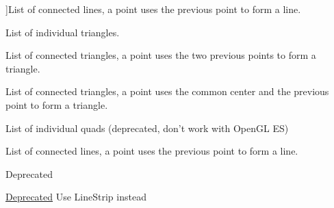 \begin{Desc}
\begin{description}
{}]List of connected lines, a point uses the previous point to form a line. \item[{\em 
\hypertarget{group__graphics_gga5ee56ac1339984909610713096283b1babdd5e75b8944a886fdaa30e5bb3adc0d}{Triangles}\label{group__graphics_gga5ee56ac1339984909610713096283b1babdd5e75b8944a886fdaa30e5bb3adc0d}
}]List of individual triangles. \item[{\em 
\hypertarget{group__graphics_gga5ee56ac1339984909610713096283b1ba05e55fec6d32c2fc8328f94d07f91184}{Triangle\-Strip}\label{group__graphics_gga5ee56ac1339984909610713096283b1ba05e55fec6d32c2fc8328f94d07f91184}
}]List of connected triangles, a point uses the two previous points to form a triangle. \item[{\em 
\hypertarget{group__graphics_gga5ee56ac1339984909610713096283b1ba363f7762b33706c805c6a451ad554f5e}{Triangle\-Fan}\label{group__graphics_gga5ee56ac1339984909610713096283b1ba363f7762b33706c805c6a451ad554f5e}
}]List of connected triangles, a point uses the common center and the previous point to form a triangle. \item[{\em 
\hypertarget{group__graphics_gga5ee56ac1339984909610713096283b1bac968add05250b2cf59350dc68043a3c0}{Quads}\label{group__graphics_gga5ee56ac1339984909610713096283b1bac968add05250b2cf59350dc68043a3c0}
}]List of individual quads (deprecated, don't work with Open\-G\-L E\-S) \item[{\em 
\hypertarget{group__graphics_gga5ee56ac1339984909610713096283b1bafc070260a0222df367922706bbeb905a}{Lines\-Strip}\label{group__graphics_gga5ee56ac1339984909610713096283b1bafc070260a0222df367922706bbeb905a}
}]List of connected lines, a point uses the previous point to form a line. \begin{DoxyRefDesc}{Deprecated}
\item[\hyperlink{deprecated__deprecated000002}{Deprecated}]Use Line\-Strip instead \end{DoxyRefDesc}

\end{description}
\end{Desc}
